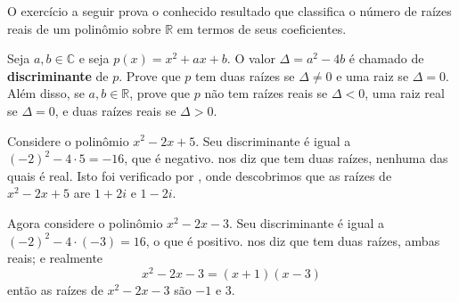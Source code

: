 O exercício a seguir prova o conhecido resultado que classifica o número de raízes reais de um polinômio sobre $\mathbb{R}$ em termos de seus coeficientes.

\begin{exercise}
\label{exDiscriminantRealRoots}
Seja $a,b \in \mathbb{C}$ e seja $p(x)=x^2+ax+b$. O valor $\Delta=a^2-4b$ é chamado de \textbf{discriminante} de $p$. Prove que $p$ tem duas raízes se $\Delta \ne 0$ e uma raiz se $\Delta = 0$. Além disso, se $a,b \in \mathbb{R}$, prove que $p$ não tem raízes reais se $\Delta < 0$, uma raiz real se $\Delta = 0$, e duas raízes reais se $ \Delta > 0$.
\end{exercise}

\begin{example}
Considere o polinômio $x^2-2x+5$. Seu discriminante é igual a $(-2)^2-4 \cdot 5 = -16$, que é negativo.  nos diz que tem duas raízes, nenhuma das quais é real. Isto foi verificado por , onde descobrimos que as raízes de $x^2-2x+5$ are $1+2i$ e $1-2i$.

Agora considere o polinômio $x^2-2x-3$. Seu discriminante é igual a $(-2)^2-4\cdot(-3) = 16$, o que é positivo.  nos diz que tem duas raízes, ambas reais; e realmente
\[ x^2-2x-3 = (x+1)(x-3) \]
então as raízes de $x^2-2x-3$ são $-1$ e $3$.
\end{example}
